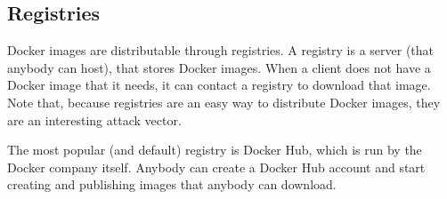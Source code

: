 \subsection{Registries}
Docker images are distributable through registries. A registry is a server (that anybody can host), that stores Docker images. When a client does not have a Docker image that it needs, it can contact a registry to download that image. Note that, because registries are an easy way to distribute Docker images, they are an interesting attack vector.

\medskip

The most popular (and default) registry is Docker Hub, which is run by the Docker company itself. Anybody can create a Docker Hub account and start creating and publishing images that anybody can download.
